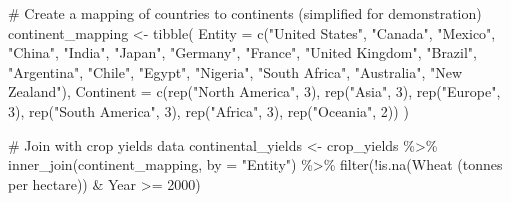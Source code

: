 \documentclass[
  letterpaper,
]{book}
\newenvironment{Shaded}{\begin{snugshade}}{\end{snugshade}}
\newcommand{\AttributeTok}[1]{\textcolor[rgb]{0.40,0.45,0.13}{#1}}
\newcommand{\CommentTok}[1]{\textcolor[rgb]{0.37,0.37,0.37}{#1}}
\newcommand{\DecValTok}[1]{\textcolor[rgb]{0.68,0.00,0.00}{#1}}
\newcommand{\FunctionTok}[1]{\textcolor[rgb]{0.28,0.35,0.67}{#1}}
\newcommand{\NormalTok}[1]{\textcolor[rgb]{0.00,0.23,0.31}{#1}}
\newcommand{\OtherTok}[1]{\textcolor[rgb]{0.00,0.23,0.31}{#1}}
\newcommand{\SpecialCharTok}[1]{\textcolor[rgb]{0.37,0.37,0.37}{#1}}
\newcommand{\StringTok}[1]{\textcolor[rgb]{0.13,0.47,0.30}{#1}}
\begin{document}
\begin{Shaded}
\begin{Highlighting}[]
\CommentTok{\# Create a mapping of countries to continents (simplified for demonstration)}
\NormalTok{continent\_mapping }\OtherTok{\textless{}{-}} \FunctionTok{tibble}\NormalTok{(}
  \AttributeTok{Entity =} \FunctionTok{c}\NormalTok{(}\StringTok{"United States"}\NormalTok{, }\StringTok{"Canada"}\NormalTok{, }\StringTok{"Mexico"}\NormalTok{, }
             \StringTok{"China"}\NormalTok{, }\StringTok{"India"}\NormalTok{, }\StringTok{"Japan"}\NormalTok{, }
             \StringTok{"Germany"}\NormalTok{, }\StringTok{"France"}\NormalTok{, }\StringTok{"United Kingdom"}\NormalTok{, }
             \StringTok{"Brazil"}\NormalTok{, }\StringTok{"Argentina"}\NormalTok{, }\StringTok{"Chile"}\NormalTok{,}
             \StringTok{"Egypt"}\NormalTok{, }\StringTok{"Nigeria"}\NormalTok{, }\StringTok{"South Africa"}\NormalTok{,}
             \StringTok{"Australia"}\NormalTok{, }\StringTok{"New Zealand"}\NormalTok{),}
  \AttributeTok{Continent =} \FunctionTok{c}\NormalTok{(}\FunctionTok{rep}\NormalTok{(}\StringTok{"North America"}\NormalTok{, }\DecValTok{3}\NormalTok{), }
                \FunctionTok{rep}\NormalTok{(}\StringTok{"Asia"}\NormalTok{, }\DecValTok{3}\NormalTok{), }
                \FunctionTok{rep}\NormalTok{(}\StringTok{"Europe"}\NormalTok{, }\DecValTok{3}\NormalTok{), }
                \FunctionTok{rep}\NormalTok{(}\StringTok{"South America"}\NormalTok{, }\DecValTok{3}\NormalTok{),}
                \FunctionTok{rep}\NormalTok{(}\StringTok{"Africa"}\NormalTok{, }\DecValTok{3}\NormalTok{),}
                \FunctionTok{rep}\NormalTok{(}\StringTok{"Oceania"}\NormalTok{, }\DecValTok{2}\NormalTok{))}
\NormalTok{)}

\CommentTok{\# Join with crop yields data}
\NormalTok{continental\_yields }\OtherTok{\textless{}{-}}\NormalTok{ crop\_yields }\SpecialCharTok{\%\textgreater{}\%}
  \FunctionTok{inner\_join}\NormalTok{(continent\_mapping, }\AttributeTok{by =} \StringTok{"Entity"}\NormalTok{) }\SpecialCharTok{\%\textgreater{}\%}
  \FunctionTok{filter}\NormalTok{(}\SpecialCharTok{!}\FunctionTok{is.na}\NormalTok{(}\StringTok{\textasciigrave{}}\AttributeTok{Wheat (tonnes per hectare)}\StringTok{\textasciigrave{}}\NormalTok{) }\SpecialCharTok{\&}\NormalTok{ Year }\SpecialCharTok{\textgreater{}=} \DecValTok{2000}\NormalTok{)}


\end{Highlighting}
\end{Shaded}
\end{document}
